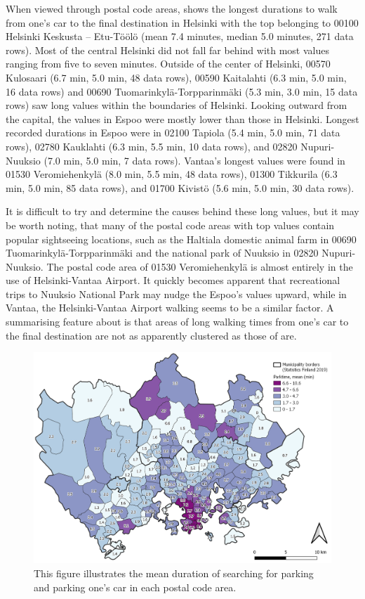 When viewed through postal code areas,  shows the longest durations to walk from one's car to the final destination in Helsinki with the top belonging to 00100 Helsinki Keskusta -- Etu-Töölö (mean 7.4 minutes, median 5.0 minutes, 271 data rows). Most of the central Helsinki did not fall far behind with most values ranging from five to seven minutes. Outside of the center of Helsinki, 00570 Kulosaari (6.7 min, 5.0 min, 48 data rows), 00590 Kaitalahti (6.3 min, 5.0 min, 16 data rows) and 00690 Tuomarinkylä-Torpparinmäki (5.3 min, 3.0 min, 15 data rows) saw long  values within the boundaries of Helsinki. Looking outward from the capital, the  values in Espoo were mostly lower than those in Helsinki. Longest recorded durations in Espoo were in 02100 Tapiola (5.4 min, 5.0 min, 71 data rows), 02780 Kauklahti (6.3 min, 5.5 min, 10 data rows), and 02820 Nupuri-Nuuksio (7.0 min, 5.0 min, 7 data rows). Vantaa's longest  values were found in 01530 Veromiehenkylä (8.0 min, 5.5 min, 48 data rows), 01300 Tikkurila (6.3 min, 5.0 min, 85 data rows), and 01700 Kivistö (5.6 min, 5.0 min, 30 data rows). 

It is difficult to try and determine the causes behind these long  values, but it may be worth noting, that many of the postal code areas with top values contain popular sightseeing locations, such as the Haltiala domestic animal farm in 00690 Tuomarinkylä-Torpparinmäki and the national park of Nuuksio in 02820 Nupuri-Nuuksio. The postal code area of 01530 Veromiehenkylä is almost entirely in the use of Helsinki-Vantaa Airport. It quickly becomes apparent that recreational trips to Nuuksio National Park may nudge the Espoo's  values upward, while in Vantaa, the Helsinki-Vantaa Airport walking seems to be a similar factor. A summarising feature about  is that areas of long walking times from one's car to the final destination are not as apparently clustered as those of  are.


\begin{figure}[H]%
    \centering
    \includegraphics[width=.88\textwidth]{images/thesis_postalvis_parkmean.png}
    \caption[Parktime, mean, in the reseach area]{This figure illustrates the mean duration of searching for parking and parking one's car in each postal code area.}%
    \label{fig:postalvis_parkmean}%
\end{figure}

